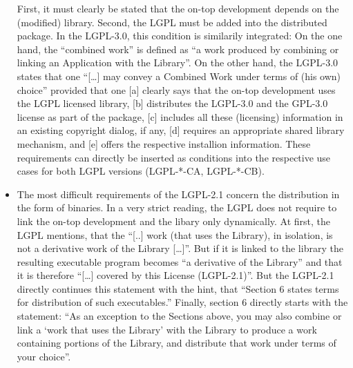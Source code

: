 \begin{itemize}
  First, it must clearly be stated that the on-top development depends on the
  (modified) library. Second, the LGPL must be added into the distributed
  package. In the LGPL-3.0, this condition is similarily
  integrated: On the one hand, the \enquote{combined work} is defined as
  \enquote{a work produced by combining or linking an Application with the
  Library}. On the other hand, the LGPL-3.0 states that one
  \enquote{[\ldots] may convey a Combined Work under terms of (his own) choice}
  provided that one [a] clearly says that the on-top development uses the LGPL
  licensed library, [b] distributes the LGPL-3.0 and the GPL-3.0 license as part
  of the package, [c] includes all these (licensing) information in an existing
  copyright dialog, if any, [d] requires an appropriate shared library mechanism,
  and [e] offers the respective installion information. These
  requirements can directly be inserted as conditions into the respective use
  cases for both LGPL versions (LGPL-*-CA, LGPL-*-CB).
  
\item The most difficult requirements of the LGPL-2.1 concern the distribution
  in the form of binaries. In a very strict reading, the LGPL does not require
  to link the on-top development and the libary only dynamically. At first, the
  LGPL mentions, that the \enquote{[..] work (that uses the Library), in
  isolation, is not a derivative work of the Library [\ldots]}. But if it is
  linked to the library the resulting executable program becomes
  \enquote{a derivative of the Library} and that it is therefore
  \enquote{[\ldots] covered by this License (LGPL-2.1)}. But the LGPL-2.1 
  directly continues this statement with the hint, that \enquote{Section 6
  states terms for distribution of such executables.} Finally,
  section 6 directly starts with the statement: \enquote{As an exception to the
  Sections above, you may also combine or link a `work that uses the
  Library' with the Library to produce a work containing portions of the
  Library, and distribute that work under terms of your choice}.
  

\end{itemize}
